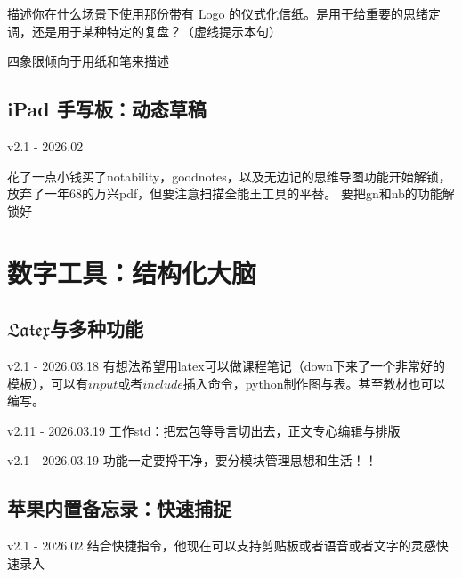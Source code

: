 \documentclass[11pt, a4paper, oneside]{book}
\begin{document}
描述你在什么场景下使用那份带有 Logo 的仪式化信纸。是用于给重要的思绪定调，还是用于某种特定的复盘？（虚线提示本句）

四象限倾向于用纸和笔来描述

\section{iPad 手写板：动态草稿}

\begin{updatelog}{v2.1 - 2026.02}
   
    花了一点小钱买了notability，goodnotes，以及无边记的思维导图功能开始解锁，放弃了一年68的万兴pdf，但要注意扫描全能王工具的平替。
    要把gn和nb的功能解锁好
    
\end{updatelog}

\chapter{数字工具：结构化大脑}

\section{{$\mathfrak{Latex}$}与多种功能}
\begin{flowing}{v2.1 - 2026.03.18}
    有想法希望用latex可以做课程笔记（down下来了一个非常好的模板），可以有$input$或者$include$插入命令，python制作图与表。甚至教材也可以编写。
\end{flowing}

\begin{updatelog}{v2.11 - 2026.03.19}
    工作std：把宏包等导言切出去，正文专心编辑与排版
\end{updatelog}

\begin{dododo}{v2.1 - 2026.03.19}
    功能一定要捋干净，要分模块管理思想和生活！！
   
\end{dododo}

\section{苹果内置备忘录：快速捕捉}
\begin{updatelog}{v2.1 - 2026.02}
    结合快捷指令，他现在可以支持剪贴板或者语音或者文字的灵感快速录入
\end{updatelog}
\end{document}
